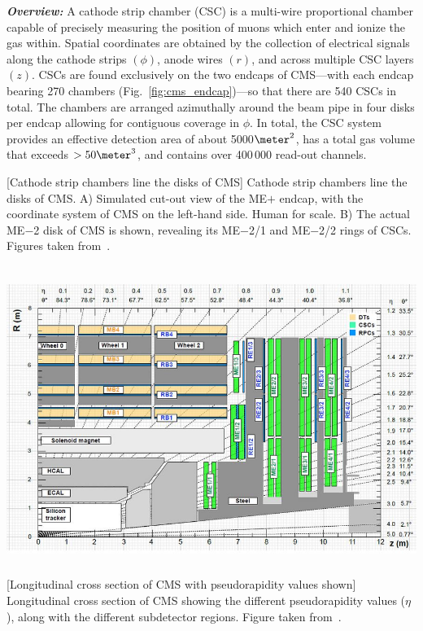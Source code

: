 \textit{\textbf{Overview:}}
A cathode strip chamber (CSC) is a multi-wire proportional chamber capable of precisely measuring the position of muons which enter and ionize the gas within.
Spatial coordinates are obtained by the collection of electrical signals along the cathode strips $(\phi)$, anode wires $(r)$, and across multiple CSC layers $(z)$.
CSCs are found exclusively on the two endcaps of CMS---with each endcap bearing 270 chambers (Fig.~\ref{fig:cms_endcap})---so that there are 540 CSCs in total.
The chambers are arranged azimuthally around the beam pipe in four disks per endcap allowing for contiguous coverage in $\phi$.
In total, the CSC system provides an effective detection area of about 5000$\meter^2$, has a total gas volume that exceeds $> 50\meter^{3}$, and contains over 400\,000 read-out channels.
\begin{multiFigure}
    \centering
        [Cathode strip chambers line the disks of CMS]
        {Cathode strip chambers line the disks of CMS.
        \;A) Simulated cut-out view of the ME$+$ endcap, with the coordinate system of CMS on the left-hand side.
        Human for scale.
        \;B) The actual ME$-$2 disk of CMS is shown, revealing its ME$-$2/1 and ME$-$2/2 rings of CSCs.
        Figures taken from~\cite{collaboration_cms_2008}.}
    \label{fig:cms_endcap}
\end{multiFigure}
\begin{multiFigure}
    \centering
        \includegraphics[width=15cm,height=10cm,keepaspectratio]{figures/cms/cms_longitudinal_view.png}
        [Longitudinal cross section of CMS with pseudorapidity values shown]
        {Longitudinal cross section of CMS showing the different pseudorapidity values ($\eta$), along with the different subdetector regions.
        Figure taken from~\cite{cms_long_xs_view}.}
    \label{fig:cms_long_view_subdetectors}
\end{multiFigure}
